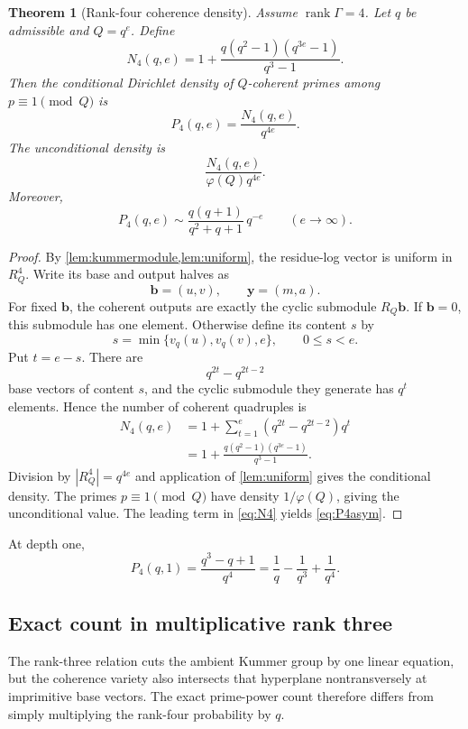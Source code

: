 \documentclass[11pt]{article}
\newtheorem{theorem}{Theorem}[section]
\theoremstyle{definition}
\theoremstyle{remark}
\newcommand{\rank}{\operatorname{rank}}
\begin{document}
\begin{theorem}[Rank-four coherence density]\label{thm:rank4density}
Assume $\rank\Gamma=4$.  Let $q$ be admissible and $Q=q^e$.  Define
\[
 N_{4}(q,e)
 =1+\frac{q(q^2-1)(q^{3e}-1)}{q^3-1}.
 \tag{4.3}\label{eq:N4}
\]
Then the conditional Dirichlet density of $Q$-coherent primes among
$p\equiv1\pmod Q$ is
\[
       P_4(q,e)=\frac{N_4(q,e)}{q^{4e}}.
       \tag{4.4}\label{eq:P4}
\]
The unconditional density is
\[
       \frac{N_4(q,e)}{\varphi(Q)q^{4e}}.
\]
Moreover,
\[
       P_4(q,e)
       \sim \frac{q(q+1)}{q^2+q+1}\,q^{-e}
       \qquad(e\to\infty).
       \tag{4.5}\label{eq:P4asym}
\]
\end{theorem}
\begin{proof}
By \cref{lem:kummermodule,lem:uniform}, the residue-log vector is uniform in
$R_Q^4$.  Write its base and output halves as
\[
       \bm b=(u,v),\qquad \bm y=(m,a).
\]
For fixed $\bm b$, the coherent outputs are exactly the cyclic submodule
$R_Q\bm b$.  If $\bm b=0$, this submodule has one element.  Otherwise define its content
$s$ by
\[
        s=\min\{v_q(u),v_q(v),e\},\qquad 0\le s<e.
\]
Put $t=e-s$.  There are
\[
        q^{2t}-q^{2t-2}
\]
base vectors of content $s$, and the cyclic submodule they generate has $q^t$ elements.  Hence
the number of coherent quadruples is
\[
\begin{split}
  N_4(q,e)
   &=1+\sum_{t=1}^{e}(q^{2t}-q^{2t-2})q^t\\
   &=1+\frac{q(q^2-1)(q^{3e}-1)}{q^3-1}.
\end{split}
\]
Division by $|R_Q^4|=q^{4e}$ and application of \cref{lem:uniform} gives the conditional
density.  The primes $p\equiv1\pmod Q$ have density $1/\varphi(Q)$, giving the
unconditional value.  The leading term in \eqref{eq:N4} yields \eqref{eq:P4asym}.
\end{proof}

At depth one,
\[
        P_4(q,1)=\frac{q^3-q+1}{q^4}
        =\frac1q-\frac1{q^3}+\frac1{q^4}.
        \tag{4.6}
\]

\subsection{Exact count in multiplicative rank three}

The rank-three relation cuts the ambient Kummer group by one linear equation, but the coherence
variety also intersects that hyperplane nontransversely at imprimitive base vectors.  The exact
prime-power count therefore differs from simply multiplying the rank-four probability by $q$.
\end{document}

